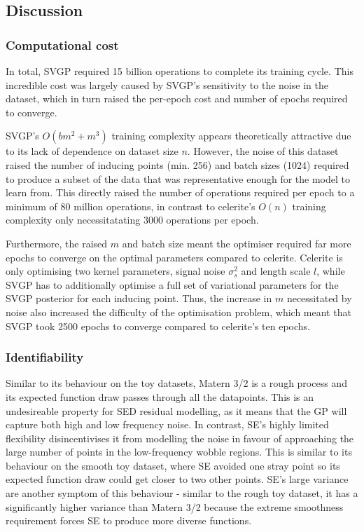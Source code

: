 \subsection{Discussion}
\subsubsection{Computational cost}
In total, SVGP required 15 billion operations to complete its training cycle. This incredible cost was largely caused by SVGP's sensitivity to the noise in the dataset, which in turn raised the per-epoch cost and number of epochs required to converge.

SVGP's $O(bm^2 + m^3)$ training complexity appears theoretically attractive due to its lack of dependence on dataset size $n$. However, the noise of this dataset raised the number of inducing points (min. 256) and batch sizes (1024) required to produce a subset of the data that was representative enough for the model to learn from. This directly raised the number of operations required per epoch to a minimum of 80 million operations, in contrast to celerite's $O(n)$ training complexity only necessitatating 3000 operations per epoch.

Furthermore, the raised $m$ and batch size meant the optimiser required far more epochs to converge on the optimal parameters compared to celerite. Celerite is only optimising two kernel parameters, signal noise $\sigma_s^2$ and length scale $l$, while SVGP has to additionally optimise a full set of variational parameters for the SVGP posterior \label{eq:svgp_posterior} for each inducing point. Thus, the increase in $m$ necessitated by noise also increased the difficulty of the optimisation problem, which meant that SVGP took 2500 epochs to converge compared to celerite's ten epochs.

\subsubsection{Identifiability}
Similar to its behaviour on the toy datasets, Matern 3/2 is a rough process and its expected function draw passes through all the datapoints. This is an undesireable property for SED residual modelling, as it means that the GP will capture both high and low frequency noise. In contrast, SE's highly limited flexibility disincentivises it from modelling the noise in favour of approaching the large number of points in the low-frequency wobble regions. This is similar to its behaviour on the smooth toy dataset, where SE avoided one stray point so its expected function draw could get closer to two other points. SE's large variance are another symptom of this behaviour - similar to the rough toy dataset, it has a significantly higher variance than Matern 3/2 because the extreme smoothness requirement forces SE to produce more diverse functions.

